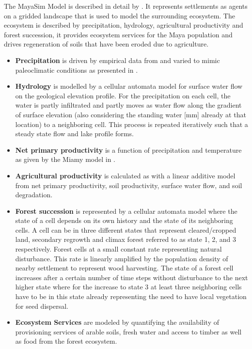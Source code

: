 The MayaSim Model is described in detail by \cite{Heckbert2013}. It represents settlements as agents on a gridded landscape that is used to model the surrounding ecosystem. The ecosystem is described by precipitation, hydrology, agricultural productivity and forest succession, it provides ecosystem services for the Maya population and drives regeneration of soils that have been eroded due to agriculture.

\begin{itemize}
    \item \textbf{Precipitation} is driven by empirical data from \cite{Hijmans2005} and varied to mimic paleoclimatic conditions as presented in \cite{Prufer2011}.
    \item \textbf{Hydrology} is modelled by a cellular automata model for surface water flow on the geological elevation profile. For the precipitation on each cell, the water is partly infiltrated and partly moves as water flow along the gradient of surface elevation (also considering the standing water [mm] already at that location) to a neighboring cell. This process is repeated iteratively such that a steady state flow and lake profile forms. 
    \item \textbf{Net primary productivity} is a function of precipitation and temperature as given by the Miamy model in \cite{Lieth1975}.
    \item \textbf{Agricultural productivity} is calculated as with a linear additive model from net primary productivity, soil productivity, surface water flow, and soil degradation.
    \item \textbf{Forest succession} is represented by a cellular automata model where the state of a cell depends on its own history and the state of its neighboring cells. A cell can be in three different states that represent cleared/cropped land, secondary regrowth and climax forest referred to as state 1, 2, and 3 respectively. Forest cells at a small constant rate representing natural disturbance. This rate is linearly amplified by the population density of nearby settlement to represent wood harvesting. The state of a forest cell increases after a certain number of time steps without disturbance to the next higher state where for the increase to state 3 at least three neighboring cells have to be in this state already representing the need to have local vegetation for seed dispersal.
	\item \textbf{Ecosystem Services} are modeled by quantifying the availability of provisioning services of arable soils, fresh water and access to timber as well as food from the forest ecosystem.
\end{itemize}


